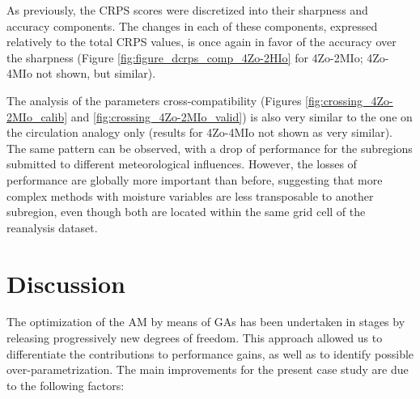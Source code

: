 \documentclass[review]{elsarticle}
\begin{document}
As previously, the CRPS scores were discretized into their sharpness and accuracy components. The changes in each of these components, expressed relatively to the total CRPS values, is once again in favor of the accuracy over the sharpness (Figure \ref{fig:figure_dcrps_comp_4Zo-2HIo} for 4Zo-2MIo; 4Zo-4MIo not shown, but similar).

The analysis of the parameters cross-compatibility (Figures \ref{fig:crossing_4Zo-2MIo_calib} and \ref{fig:crossing_4Zo-2MIo_valid}) is also very similar to the one on the circulation analogy only (results for 4Zo-4MIo not shown as very similar). The same pattern can be observed, with a drop of performance for the subregions submitted to different meteorological influences. However, the losses of performance are globally more important than before, suggesting that more complex methods with moisture variables are less transposable to another subregion, even though both are located within the same grid cell of the reanalysis dataset.


\section{Discussion}
\label{sec:discussion}

The optimization of the AM by means of GAs has been undertaken in stages by releasing progressively new degrees of freedom. This approach allowed us to differentiate the contributions to performance gains, as well as to identify possible over-parametrization. The main improvements for the present case study are due to the following factors:
\end{document}
